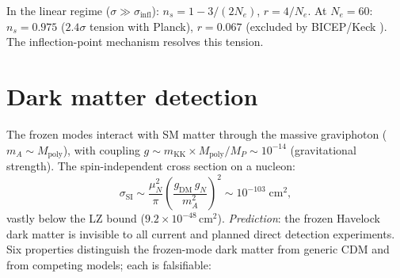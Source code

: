 In the linear regime ($\sigma \gg \sigma_{\mathrm{infl}}$):
$n_s = 1 - 3/(2N_e)$, $r = 4/N_e$.
At $N_e = 60$: $n_s = 0.975$ ($2.4\sigma$ tension with Planck),
$r = 0.067$ (excluded by BICEP/Keck \citep{BICEP2021}).
The inflection-point mechanism resolves this tension.



\section{Dark matter detection}
\label{sec:dm-detection}

The frozen modes interact with SM matter through the massive
graviphoton ($m_A \sim M_{\mathrm{poly}}$), with coupling
$g \sim m_{\mathrm{KK}} \times M_{\mathrm{poly}} / M_P
\sim 10^{-14}$ (gravitational strength).
The spin-independent cross section on a nucleon:
\[
  \sigma_{\mathrm{SI}} \sim \frac{\mu_N^2}{\pi}
  \left(\frac{g_{\mathrm{DM}}\,g_N}{m_A^2}\right)^2
  \sim 10^{-103}\;\mathrm{cm^2},
\]
vastly below the LZ bound \citep{LZ2023} ($9.2 \times 10^{-48}$\,cm$^2$).
\emph{Prediction}: the frozen Havelock dark matter is invisible
to all current and planned direct detection experiments.
Six properties distinguish the frozen-mode dark matter
from generic CDM and from competing models;
each is falsifiable:
